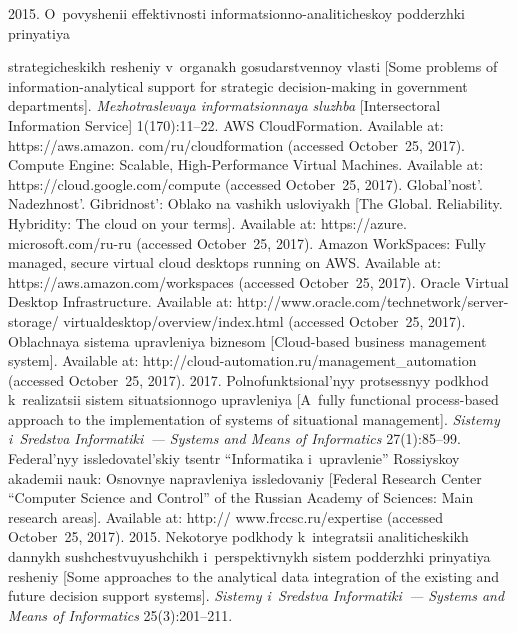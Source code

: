   \begin{multicols}{2}

\renewcommand{\bibname}{\protect\rmfamily References}

{\small\frenchspacing
 {%
 \begin{thebibliography}{99} 

 2015. O~povyshenii ef\-fek\-tiv\-nosti informatsionno-analiticheskoy 
podderzhki prinyatiya%


\noindent
 strategicheskikh resheniy v~organakh gosudarstvennoy vlasti [Some 
problems of information-analytical support for strategic decision-making in 
government departments]. \textit{Mezhotraslevaya informatsionnaya sluzhba} [Intersectoral Information Service]  
1(170):11--22.
AWS CloudFormation. Available at: {\sf https://aws.amazon. com/ru/cloudformation} (accessed 
October~25, 2017).
Compute Engine: Scalable, High-Performance Virtual Machines. Available at:  {\sf 
https://cloud.google.com/\linebreak compute} (accessed October~25, 2017). 
Global'nost'. Nadezhnost'. Gibridnost': Oblako na vashikh usloviyakh
[The Global. Reliability. Hybridity: The cloud on your terms]. Available at:  {\sf 
https://azure. microsoft.com/ru-ru} (accessed October~25, 2017).
Amazon WorkSpaces: Fully managed, secure virtual cloud  desktops 
running on AWS. Available at:  
{\sf https://aws.amazon.com/workspaces} (accessed October~25, 2017).
Oracle Virtual Desktop Infrastructure. Available at: {\sf  
http://www.oracle.com/technetwork/server-storage/ virtualdesktop/overview/index.html} (accessed 
October~25, 2017). 
Oblachnaya sistema upravleniya biznesom [Cloud-based business management system]. 
Available at: {\sf http://cloud-automation.ru/management\_automation} (accessed October~25, 2017).
 2017. Polnofunktsional'nyy protsessnyy podkhod k~realizatsii sistem 
situatsionnogo upravleniya [A~fully functional process-based approach to the implementation of 
systems of situational management]. \textit{Sistemy i~Sredstva Informatiki~--- Systems and 
Means of Informatics} 27(1):85--99.
Federal'nyy issledovatel'skiy tsentr ``Informatika i~upravlenie'' Rossiyskoy akademii nauk: 
Osnovnye napravleniya issledovaniy [Federal Research Center ``Computer Science and Control'' 
of the Russian Academy of Sciences: Main research areas]. Available at: {\sf 
http:// www.frccsc.ru/expertise} (accessed October~25, 2017).
 2015. Nekotorye podkhody k~integratsii analiticheskikh dannykh 
sushchestvuyushchikh i~perspektivnykh sistem podderzhki prinyatiya resheniy [Some 
approaches to the analytical data integration of the existing and future decision support systems]. 
\textit{Sistemy i~Sredstva Informatiki~--- Systems and Means of Informatics} 25(3):201--211.


\end{thebibliography}}}
\end{multicols}

